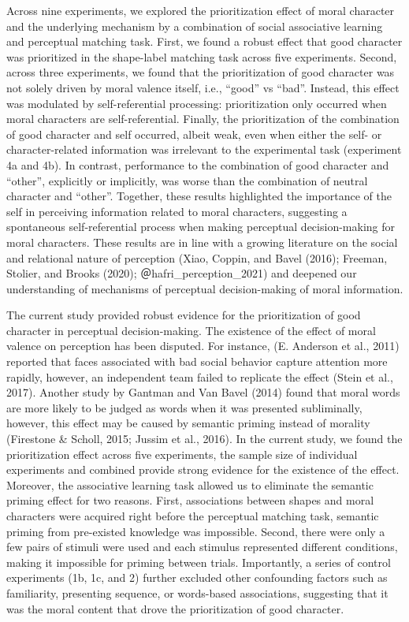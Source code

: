 \documentclass[
  man]{apa6}
\begin{document}
Across nine experiments, we explored the prioritization effect of moral character and the underlying mechanism by a combination of social associative learning and perceptual matching task. First, we found a robust effect that good character was prioritized in the shape-label matching task across five experiments. Second, across three experiments, we found that the prioritization of good character was not solely driven by moral valence itself, i.e., ``good'' vs ``bad''. Instead, this effect was modulated by self-referential processing: prioritization only occurred when moral characters are self-referential. Finally, the prioritization of the combination of good character and self occurred, albeit weak, even when either the self- or character-related information was irrelevant to the experimental task (experiment 4a and 4b). In contrast, performance to the combination of good character and ``other'', explicitly or implicitly, was worse than the combination of neutral character and ``other''. Together, these results highlighted the importance of the self in perceiving information related to moral characters, suggesting a spontaneous self-referential process when making perceptual decision-making for moral characters. These results are in line with a growing literature on the social and relational nature of perception (Xiao, Coppin, and Bavel (2016); Freeman, Stolier, and Brooks (2020); ＠hafri\_perception\_2021) and deepened our understanding of mechanisms of perceptual decision-making of moral information.

The current study provided robust evidence for the prioritization of good character in perceptual decision-making. The existence of the effect of moral valence on perception has been disputed. For instance, (E. Anderson et al., 2011) reported that faces associated with bad social behavior capture attention more rapidly, however, an independent team failed to replicate the effect (Stein et al., 2017). Another study by Gantman and Van Bavel (2014) found that moral words are more likely to be judged as words when it was presented subliminally, however, this effect may be caused by semantic priming instead of morality (Firestone \& Scholl, 2015; Jussim et al., 2016). In the current study, we found the prioritization effect across five experiments, the sample size of individual experiments and combined provide strong evidence for the existence of the effect. Moreover, the associative learning task allowed us to eliminate the semantic priming effect for two reasons. First, associations between shapes and moral characters were acquired right before the perceptual matching task, semantic priming from pre-existed knowledge was impossible. Second, there were only a few pairs of stimuli were used and each stimulus represented different conditions, making it impossible for priming between trials. Importantly, a series of control experiments (1b, 1c, and 2) further excluded other confounding factors such as familiarity, presenting sequence, or words-based associations, suggesting that it was the moral content that drove the prioritization of good character.
\end{document}
